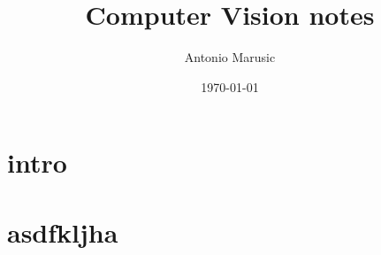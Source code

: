 \documentclass[12pt,oneside,a4paper]{article}
\title{\textbf{Computer Vision notes}}
\author{Antonio Marusic}
\date{\today}
\begin{document}
\maketitle

\section{intro}


\section{asdfkljha}

\end{document}
